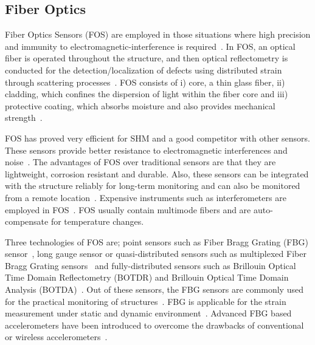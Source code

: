 \documentclass[b5paper, 11pt, titlepage]{book}
\begin{document}
\subsection{Fiber Optics}
Fiber Optics Sensors (FOS) are employed in those situations where high precision and immunity to electromagnetic-interference is required~\cite{li2018fiber}. In FOS, an optical fiber is operated throughout the structure, and then optical reflectometry is conducted for the detection/localization of defects using distributed strain through scattering processes~\cite{warsi2019sensors}. 
FOS consists of i) core, a thin glass fiber, ii) cladding, which confines the dispersion of light within the fiber core and iii) protective coating, which absorbs moisture and also provides mechanical strength~\cite{Torres2011}.

FOS has proved very efficient for SHM and a good competitor with other sensors. These sensors provide better resistance to electromagnetic interferences and noise~\cite{Das2018}. The advantages of FOS over traditional sensors are that they are lightweight, corrosion resistant and durable. Also, these sensors can be integrated with the structure reliably for long-term monitoring and can also be monitored from a remote location~\cite{casas2003fiber, Majumder2008}. Expensive instruments such as interferometers are employed in FOS~\cite{warsi2019sensors}. FOS usually contain multimode fibers and are auto-compensate for temperature changes. 

Three technologies of FOS are; point sensors such as Fiber Bragg Grating (FBG) sensor~\cite{Li2004}, long gauge sensor or quasi-distributed sensors such as multiplexed Fiber Bragg Grating sensors~\cite{Delepine-Lesoille2006} and fully-distributed sensors such as Brillouin Optical Time Domain Reflectometry (BOTDR) and Brillouin Optical Time Domain Analysis
(BOTDA)~\cite{bourne2009energy}. Out of these sensors, the FBG sensors are commonly used for the practical monitoring of structures~\cite{Majumder2008}. FBG is applicable for the strain measurement under static and dynamic environment~\cite{jawaid2018structural}. Advanced FBG based accelerometers have been introduced to overcome the drawbacks of conventional or wireless accelerometers~\cite{Majumder2008}.
\end{document}

